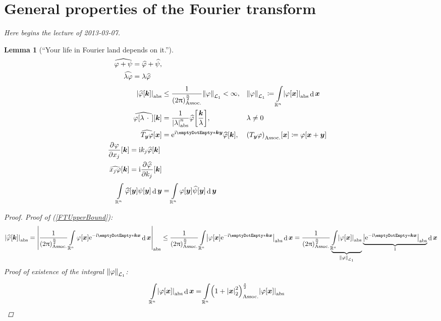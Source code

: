 \documentclass[10pt]{article}
\newtheorem*{lemma}{Lemma}
\DeclarePairedDelimiter\doubleBars{\Vert}{\Vert}
\DeclarePairedDelimiter\singleBars{\lvert}{\rvert}
\DeclarePairedDelimiter\parentheses{\lparen}{\rparen}
\DeclarePairedDelimiter\squareBrackets{[}{]}
\newcommand\I{\mathrm{i}}
\newcommand\E{\mathrm{e}}
\DeclareMathOperator{\diffd}{d}
\newcommand\ft\widehat
\newcommand\pderiv[3][]{\frac{\partial^{#1} #3}{{\partial {#2}}^{#1}}}
\newcommand{\R}{\mathbb{R}}
\newcommand\of[1]{\parentheses*{#1}}
\newcommand\pa[1]{\parentheses*{#1}}
\newcommand\abs[1]{\singleBars*{#1}}
\newcommand\norm[1]{\singleBars*{#1}}
\newcommand\Lnorm[2][\infty]{\doubleBars*{#2}_{#1}}
\newcommand\scal[2]{\emptyDotEmpty*{#1}{#2}}
\newcommand\gl\lambda
\newcommand\gj\varphi
\newcommand\gy\psi
\newcommand{\vx}{{\vectorsym x}}
\newcommand{\vy}{{\vectorsym y}}
\newcommand{\vk}{{\vectorsym k}}
\newcommand\placeholder{\,\:\cdot\:\,}
\renewcommand\pa[1]{\parentheses*{#1}_\mathrm{Assoc.}}
\renewcommand\of[1]{\squareBrackets*{#1}}
\renewcommand\norm[1]{\singleBars*{#1}_{2}}
\renewcommand\abs[1]{\singleBars*{#1}_{\mathrm{abs}}}
\renewcommand\Lnorm[2][\infty]{\doubleBars*{#2}_{\mathcal{L}_{#1}}}
\newcommand{\Rn}{{\R^n}}
\newcommand{\ftnrm}{\frac{1}{\pa{2\Pi}^\frac{n}{2}} }
\newcommand{\lectureStart}[1]{

\noindent \emph{Here begins the lecture of #1.}

}
\begin{document}
  \section{General properties of the Fourier transform}
  \lectureStart{2013-03-07}
  \begin{lemma}[``Your life in Fourier land depends on it.'']
    \begin{align}
      \label{FTLinearity}
      \begin{split}      
      \ft{\gj + \gy} &= \ft{\gj} + \ft{\gy},\\
      \ft{\gl \gj} &= \gl \ft{\gj} 
      \end{split}
      \\
      \label{FTUpperBound}
      \abs{\ft{\gj}\of\vk} &\leq \ftnrm\Lnorm[1]{\gj}<\infty, &&
      \Lnorm[1]{\gj} \coloneqq \int\Rn \abs{\gj\of\vx} \diffd \vx
      \\
      \label{FTScaling}
      \ft{\gj\of{\gl\placeholder}}\of\vk &= \frac{1}{\abs{\gl}^n}\ft{\gj}\of{\frac\vk\gl}, &&
      \gl\neq 0
      \\
      \label{FTTranslation}
      \ft{T_\vy\gj}\of\vx &= \E^{\I\scal\vk\vy}\ft\gj\of\vk, &&
      \pa{T_\vy\gj}\of\vx \coloneqq \gj\of{\vx+\vy}
      \\
      \label{FTDerivative}
      \begin{split}
      \pderiv{x_j}\gj\of\vk &= \I k_j \ft\gj\of\vk \\ 
      \ft{x_j \gj}\of\vk &= \I \pderiv{k_j}{\ft\gj} \of\vk
      \end{split}
      \\
      \label{FTUnitary}
      \int\Rn\ft\gj\of\vy \gy\of\vy \diffd\vy &= \int\Rn \gj\of\vy \ft\gy\of\vy \diffd\vy
    \end{align}
    \begin{proof}
      Proof of (\ref{FTUpperBound}):
      \begin{equation*}
       \abs{\ft\gj\of\vk} 
        = \abs{\ftnrm\int\Rn \gj\of\vx \E^{-\I \scal\vk\vx}\diffd\vx} 
        \leq \ftnrm\int\Rn \abs{\gj\of\vx 
        \E^{-\I \scal\vk\vx}}\diffd\vx  = \ftnrm
        \underbrace{\int\Rn \abs{\gj\of\vx}}_{\Lnorm[1]{\gj}}
        \underbrace{\abs{\E^{-\I\scal\vk\vx}}}_{1}\diffd\vx \\
      \end{equation*}
      Proof of existence of the integral $\Lnorm[1]\gj$:
      \begin{align*}
        \int\Rn\abs{\gj\of\vx}\diffd\vx 
        &= \int\Rn\pa{1+\norm{\vx}^2}^\frac{s}{2}\abs{\gj\of\vx}

\end{align*}
\end{proof}
\end{lemma}
\end{document}
